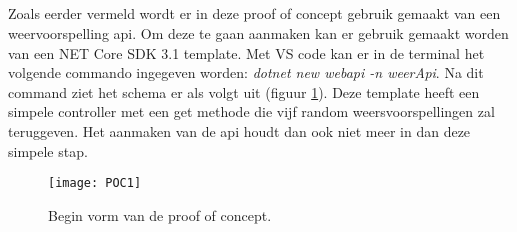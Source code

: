 \subsection{}
Zoals eerder vermeld wordt er in deze proof of concept gebruik gemaakt van een weervoorspelling api. Om deze te gaan aanmaken kan er gebruik gemaakt worden van een NET Core SDK 3.1 template. Met VS code kan er in de terminal het volgende commando ingegeven worden: \emph{dotnet new webapi -n weerApi}.\newline
Na dit command ziet het schema er als volgt uit (figuur \ref{fig:poc1}). Deze template heeft een simpele controller met een get methode die vijf random weersvoorspellingen zal teruggeven. Het aanmaken van de api houdt dan ook niet meer in dan deze simpele stap.
\begin{figure}[H]
	\centering
	\texttt{[image: POC1]} 
	\caption[BeginPOC]{Begin vorm van de proof of concept.}
	\label{fig:poc1}
\end{figure}
